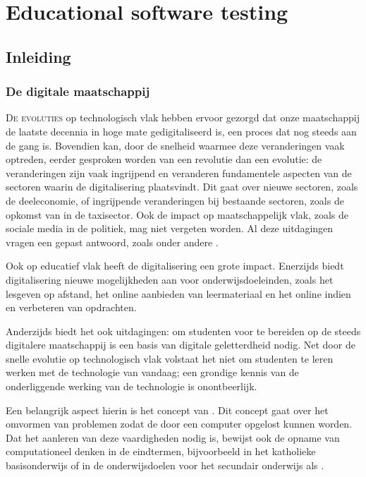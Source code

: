\chapter{Educational software testing}\label{ch:dodona}

\section{Inleiding}\label{sec:inleiding}

\subsection{De digitale maatschappij}\label{subsec:de-digitale-maatschappij}

\lettrine{D}{e evoluties} op technologisch vlak hebben ervoor gezorgd dat onze maatschappij de laatste decennia in hoge mate gedigitaliseerd is, een proces dat nog steeds aan de gang is.
Bovendien kan, door de snelheid waarmee deze veranderingen vaak optreden, eerder gesproken worden van een revolutie dan een evolutie: de veranderingen zijn vaak ingrijpend en veranderen fundamentele aspecten van de sectoren waarin de digitalisering plaatsvindt.
Dit gaat over nieuwe sectoren, zoals de deeleconomie, of ingrijpende veranderingen bij bestaande sectoren, zoals de opkomst van  in de taxisector.
Ook de impact op maatschappelijk vlak, zoals de sociale media in de politiek, mag niet vergeten worden.
Al deze uitdagingen vragen een gepast antwoord, zoals onder andere \autocite{hipeac2019}.

Ook op educatief vlak heeft de digitalisering een grote impact.
Enerzijds biedt digitalisering nieuwe mogelijkheden aan voor onderwijsdoeleinden, zoals het lesgeven op afstand, het online aanbieden van leermateriaal en het online indien en verbeteren van opdrachten.

Anderzijds biedt het ook uitdagingen: om studenten voor te bereiden op de steeds digitalere maatschappij is een basis van digitale geletterdheid nodig.
Net door de snelle evolutie op technologisch vlak volstaat het niet om studenten te leren werken met de technologie van vandaag;
een grondige kennis van de onderliggende werking van de technologie is onontbeerlijk.

Een belangrijk aspect hierin is het concept van .
Dit concept gaat over het omvormen van problemen zodat de door een computer opgelost kunnen worden.
Dat het aanleren van deze vaardigheden nodig is, bewijst ook de opname van computationeel denken in de eindtermen, bijvoorbeeld in het katholieke basisonderwijs \autocite{zinin2017} of in de onderwijsdoelen voor het secundair onderwijs als  \autocite{2019040867}.

